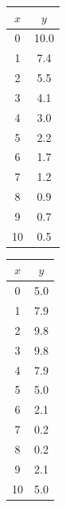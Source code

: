 \noindent
\begin{minipage}[t]{0.48\columnwidth}
\centering
\begin{tabular}{c|c}
$x$ & $y$ \\
\hline
0 & 10.0 \\
1 & 7.4 \\
2 & 5.5 \\
3 & 4.1 \\
4 & 3.0 \\
5 & 2.2 \\
6 & 1.7 \\
7 & 1.2 \\
8 & 0.9 \\
9 & 0.7 \\
10 & 0.5 \\
\end{tabular}
\end{minipage}
\hfill
\begin{minipage}[t]{0.48\columnwidth}
\centering
\begin{tabular}{c|c}
$x$ & $y$ \\
\hline
0 & 5.0 \\
1 & 7.9 \\
2 & 9.8 \\
3 & 9.8 \\
4 & 7.9 \\
5 & 5.0 \\
6 & 2.1 \\
7 & 0.2 \\
8 & 0.2 \\
9 & 2.1 \\
10 & 5.0 \\
\end{tabular}
\end{minipage}

\medskip



